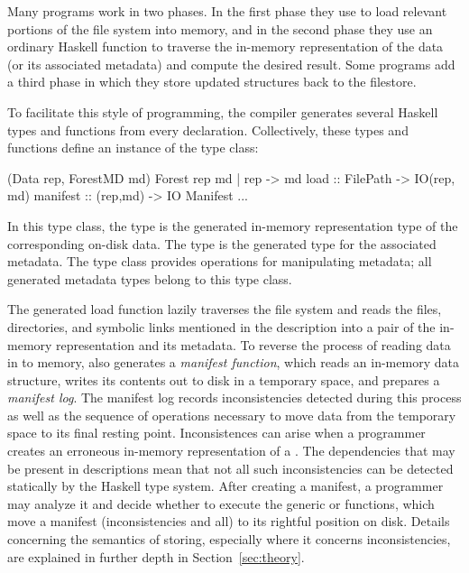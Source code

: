 Many \forest{} programs work in two phases. In the first phase they
use \forest{} to load relevant portions of the file system into memory,
and in the second phase they use an ordinary Haskell function to
traverse the in-memory representation of the data (or its associated
metadata) and compute the desired result.  Some \forest{} programs
add a third phase in which they store updated structures back to the
filestore.

To facilitate this style of programming, the \forest{} compiler
generates several Haskell types and functions from every \forest{}
declaration.  Collectively, these types and functions define an instance
of the  type class:
\begin{code}
 (Data rep, ForestMD md) 
      \kw{=>} Forest rep md | rep -> md  
   load     :: FilePath -> IO(rep, md)
   manifest :: (rep,md) -> IO Manifest
   ...
\end{code}
In this type class, the type  is the generated in-memory
representation type
of the corresponding on-disk data.  The type  is the generated type for the associated metadata.
The  type class provides
operations for manipulating \forest{} metadata; all generated metadata
types belong to this type class.

The generated load function lazily traverses the
file system and reads the files, directories, and symbolic links
mentioned in the description into a pair of the in-memory
representation and its metadata.
To reverse the process of reading data in to memory, \forest{}
also generates a \emph{manifest function}, which reads an in-memory
data structure, writes its contents out to disk in a temporary
space, and prepares a 
\emph{manifest log}.  The manifest log records inconsistencies
detected during this process as well as the sequence
of operations necessary to move data from the temporary space to
its final resting point.  Inconsistences
can arise when a programmer creates an erroneous in-memory
representation of a \filestore{}.
The dependencies that may be present in
\forest{} descriptions mean that not all such inconsistencies 
can be detected statically by the Haskell type system.
After creating a manifest, a programmer may analyze it
and decide whether to execute the 
generic  or 
functions, which move a manifest (inconsistencies and all) to its 
rightful position on disk. 
Details concerning the semantics of storing, 
especially where it concerns inconsistencies,
are explained in further depth in Section~\ref{sec:theory}.

